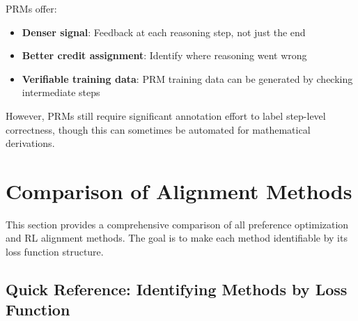 PRMs offer:
\begin{itemize}
    \item \textbf{Denser signal}: Feedback at each reasoning step, not just the end
    \item \textbf{Better credit assignment}: Identify where reasoning went wrong
    \item \textbf{Verifiable training data}: PRM training data can be generated by checking intermediate steps
\end{itemize}

However, PRMs still require significant annotation effort to label step-level correctness, though this can sometimes be automated for mathematical derivations.

\section{Comparison of Alignment Methods}

This section provides a comprehensive comparison of all preference optimization and RL alignment methods. The goal is to make each method identifiable by its loss function structure.

\subsection{Quick Reference: Identifying Methods by Loss Function}

